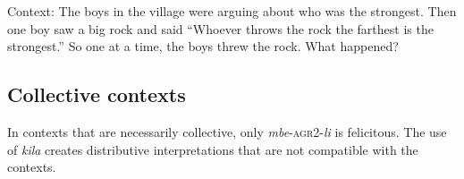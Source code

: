 \documentclass[output=paper,modfonts,nonflat]{langsci/langscibook}
\begin{document}
\begin{exe}
\ex Context: The boys in the village were arguing about who was the strongest. Then one boy saw a big rock and said ``Whoever throws the rock the farthest is the strongest.'' So one at a time, the boys threw the rock. What happened?   \label{ex:kaspercushman:stone}
\begin{xlist}



\end{xlist}
\end{exe}


\subsection{Collective contexts}

In contexts that are necessarily collective, only \textit{mbe}-\textsc{agr2}-\textit{li} is felicitous.  The use of \textit{kila} creates distributive interpretations that are not compatible with the contexts. 
\end{document}
